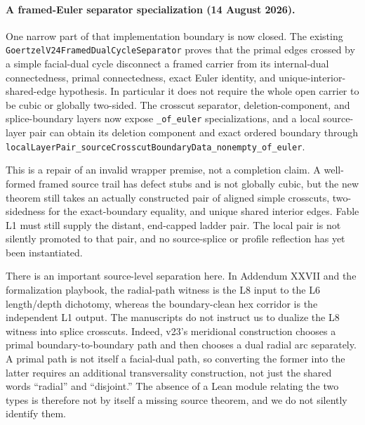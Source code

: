 \documentclass[11pt]{article}
\theoremstyle{definition}
\begin{document}
\paragraph{A framed-Euler separator specialization (14 August 2026).}
One narrow part of that implementation boundary is now closed.  The existing
\texttt{GoertzelV24FramedDualCycleSeparator} proves that the primal edges
crossed by a simple facial-dual cycle disconnect a framed carrier from its
internal-dual connectedness, primal connectedness, exact Euler identity, and
unique-interior-shared-edge hypothesis.  In particular it does not require
the whole open carrier to be cubic or globally two-sided.  The crosscut
separator, deletion-component, and splice-boundary layers now expose
\texttt{\_of\_euler} specializations, and a local source-layer pair can obtain
its deletion component and exact ordered boundary through
\texttt{localLayerPair\_sourceCrosscutBoundaryData\_nonempty\_of\_euler}.

This is a repair of an invalid wrapper premise, not a completion claim.  A
well-formed framed source trail has defect stubs and is not globally cubic,
but the new theorem still takes an actually constructed pair of aligned simple
crosscuts, two-sidedness for the exact-boundary equality, and unique shared
interior edges.  Fable L1 must still supply the distant, end-capped ladder
pair.  The local pair is not silently promoted to that pair, and no
source-splice or profile reflection has yet been instantiated.

There is an important source-level separation here.  In Addendum XXVII and
the formalization playbook, the radial-path witness is the L8 input to the L6
length/depth dichotomy, whereas the boundary-clean hex corridor is the
independent L1 output.  The manuscripts do not instruct us to dualize the L8
witness into splice crosscuts.  Indeed, v23's meridional construction chooses
a primal boundary-to-boundary path and then chooses a dual radial arc
separately.  A primal path is not itself a facial-dual path, so converting the
former into the latter requires an additional transversality construction, not
just the shared words ``radial'' and ``disjoint.''  The absence of a Lean
module relating the two types is therefore not by itself a missing source
theorem, and we do not silently identify them.
\end{document}
